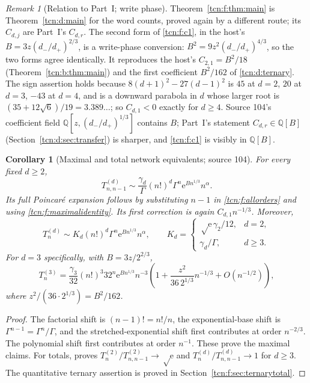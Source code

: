 \documentclass[11pt,letterpaper]{article}
\newcommand{\ee}{\mathrm e}
\newcommand{\Q}{\mathbb Q}
\newtheorem{corollary}[theorem]{Corollary}
\theoremstyle{remark}
\newtheorem{remark}[theorem]{Remark}
\begin{document}
\begin{remark}[Relation to Part~I; write phase]\label{tcn:f:rem:main}
Theorem~\ref{tcn:f:thm:main} is Theorem~\ref{tcn:d:main} for the word counts, proved again by a different route; its $C_{d,j}$ are Part~I's $C_{d,r}$. The second form of \eqref{tcn:f:c1}, in the host's $B=3z(d_-/d_+)^{2/3}$, is a write-phase conversion: $B^2=9z^2(d_-/d_+)^{4/3}$, so the two forms agree identically. It reproduces the host's $C_{2,1}=B^2/18$ (Theorem~\ref{tcn:b:thm:main}) and the first coefficient $B^2/162$ of \eqref{tcn:d:ternary}. The sign assertion holds because $8(d+1)^2-27(d-1)^2$ is $45$ at $d=2$, $20$ at $d=3$, $-43$ at $d=4$, and is a downward parabola in $d$ whose larger root is $(35+12\sqrt6)/19=3.389\ldots$; so $C_{d,1}<0$ exactly for $d\ge4$. Source 104's coefficient field $\Q[z,(d_-/d_+)^{1/3}]$ contains $B$; Part~I's statement $C_{d,r}\in\Q[B]$ (Section~\ref{tcn:d:sec:transfer}) is sharper, and \eqref{tcn:f:c1} is visibly in $\Q[B]$.
\end{remark}

\begin{corollary}[Maximal and total network equivalents; source 104]\label{tcn:f:cor:network}
For every fixed $d\ge2$,
\begin{equation}\label{tcn:f:maximalequivalent}
 T^{(d)}_{n,n-1}\sim\frac{\gamma_d}{\Gamma}(n!)^d\Gamma^n\ee^{Bn^{1/3}}n^\alpha.
\end{equation}
Its full Poincar\'e expansion follows by substituting $n-1$ in \eqref{tcn:f:allorders} and using \eqref{tcn:f:maximalidentity}. Its first correction is again $C_{d,1}n^{-1/3}$. Moreover,
\begin{equation}\label{tcn:f:totalequivalent}
 T^{(d)}_n\sim K_d(n!)^d\Gamma^n\ee^{Bn^{1/3}}n^\alpha,
 \qquad K_d=\begin{cases}\sqrt\ee\,\gamma_2/12,&d=2,\\\gamma_d/\Gamma,&d\ge3.\end{cases}
\end{equation}
For $d=3$ specifically, with $B=3z/2^{2/3}$,
\begin{equation}\label{tcn:f:total3}
 T^{(3)}_n=\frac{\gamma_3}{32}(n!)^3 32^n
 \ee^{Bn^{1/3}}n^{-3}
 \left(1+\frac{z^2}{36\,2^{1/3}}n^{-1/3}+O(n^{-1/2})\right),
\end{equation}
where $z^2/(36\cdot2^{1/3})=B^2/162$.
\end{corollary}
\begin{proof}
The factorial shift is $(n-1)!=n!/n$, the exponential-base shift is $\Gamma^{n-1}=\Gamma^n/\Gamma$, and the stretched-exponential shift first contributes at order $n^{-2/3}$. The polynomial shift first contributes at order $n^{-1}$. These prove the maximal claims. For totals, \cite[Corollary 1.11]{Chang2024} proves $T^{(2)}_n/T^{(2)}_{n,n-1}\to\sqrt\ee$ and $T^{(d)}_n/T^{(d)}_{n,n-1}\to1$ for $d\ge3$. The quantitative ternary assertion is proved in Section~\ref{tcn:f:sec:ternarytotal}.
\end{proof}
\end{document}
